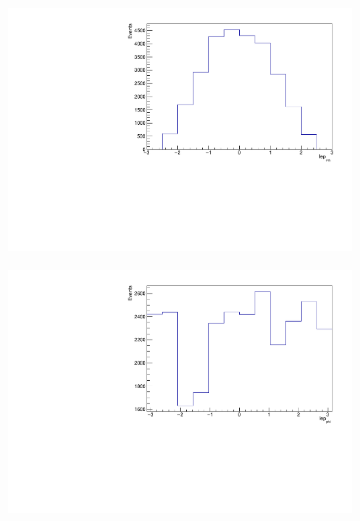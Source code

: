 \begin{figure}[h]
  \begin{subfigure}{0.5\textwidth}
    \centering
    \includegraphics[width=\linewidth]{plots_and_txt/ttbar.mu_selected_/ttbar.mu_selected_lep_eta.pdf}
    \caption{}
    \label{fig:lep_pt2}
  \end{subfigure}%
  \begin{subfigure}{0.5\textwidth}
    \centering
    \includegraphics[width=\linewidth]{plots_and_txt/ttbar.mu_selected_/ttbar.mu_selected_lep_phi.pdf}
    \caption{}
    \label{fig:btagged2}
  \end{subfigure}%
  \newline
  \begin{subfigure}{0.5\textwidth}
    \centering

\end{subfigure}
\end{figure}

